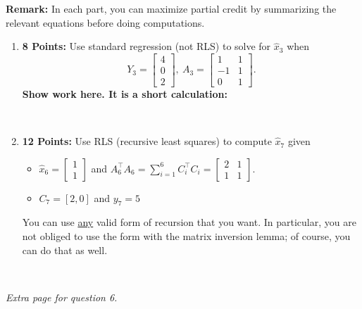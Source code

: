 \documentclass[letterpaper]{article}
\begin{document}
\noindent \textbf{Remark:} In each part, you can maximize partial credit by summarizing the relevant equations before doing computations.

\begin{enumerate}
\renewcommand{\labelenumi}{(\alph{enumi})}
\setlength{\itemsep}{1.5cm}
\item \textbf{8 Points:} Use standard regression (not RLS) to solve for $\hat{x}_3$ when
$$ Y_3 =\left[ \begin{array}{c} 4 \\0 \\ 2 \end{array} \right],~   A_3 = \left[ \begin{array}{rr} 1 & 1 \\ -1 & 1 \\ 0 & 1\end{array}  \right].$$
\textbf{Show work here. It is a short calculation:}

\\

\item  \textbf{12 Points:}  Use RLS (recursive least squares) to compute $\hat{x}_7$ given\\
\begin{itemize}
\item $\widehat{x}_{6}=\left[ \begin{array}{c} 1 \\ 1 \end{array} \right]$ and $ A_{6}^\top A_{6} =\sum_{i=1}^{6} C_i^\top C_i=\left[ \begin{array}{rr}  2&  1\\  1& 1\end{array} \right].$ \medskip
\item $C_{7}=[ 2, 0]$ and $y_{7}=5$

\end{itemize}
You can use \underline{any} valid form of recursion that you want. In particular, you are not obliged to use the form with the matrix inversion lemma; of course, you can do that as well.

\\
\end{enumerate}




\newpage
\textit{Extra page for question 6.}
\newpage
\end{document}
